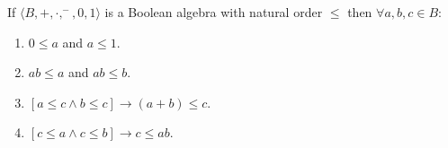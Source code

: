 If $\langle B, +, \cdot, ^-, 0, 1 \rangle$ is a Boolean algebra with natural order $\leq$ then $\forall a, b, c \in B$:
\begin{enumerate}
\item $0 \leq a$ and $a \leq 1$.
\item $ab \leq a$ and $ab \leq b$.
\item $[a \leq c \land b \leq c] \rightarrow (a + b) \leq c$.
\item $[c \leq a \land c \leq b] \rightarrow c \leq ab$.
\end{enumerate}
